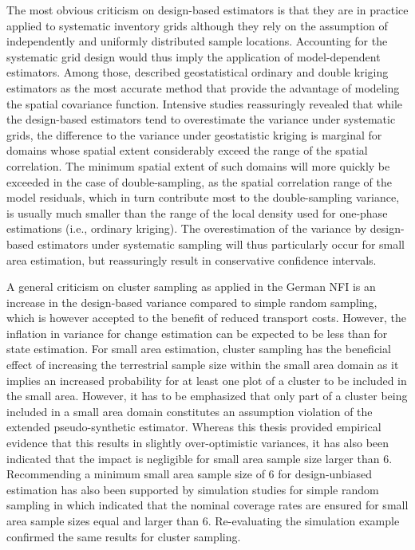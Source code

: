 The most obvious criticism on design-based estimators is that they are in practice applied to systematic inventory grids although they rely on the assumption of independently and uniformly distributed sample locations. Accounting for the systematic grid design would thus imply the application of model-dependent estimators. Among those, \citet{mandallaz1993} described geostatistical ordinary and double kriging estimators as the most accurate method that provide the advantage of modeling the spatial covariance function. Intensive studies reassuringly revealed that while the design-based estimators tend to overestimate the variance under systematic grids, the difference to the variance under geostatistic kriging is marginal for domains whose spatial extent considerably exceed the range of the spatial correlation. The minimum spatial extent of such domains will more quickly be exceeded in the case of double-sampling, as the spatial correlation range of the model residuals, which in turn contribute most to the double-sampling variance, is usually much smaller than the range of the local density used for one-phase estimations (i.e., ordinary kriging). The overestimation of the variance by design-based estimators under systematic sampling will thus particularly occur for small area estimation, but reassuringly result in conservative confidence intervals.\par

A general criticism on cluster sampling as applied in the German NFI is an increase in the design-based variance compared to simple random sampling, which is however accepted to the benefit of reduced transport costs. However, the inflation in variance for change estimation can be expected to be less than for state estimation. For small area estimation, cluster sampling has the beneficial effect of increasing the terrestrial sample size within the small area domain as it implies an increased probability for at least one plot of a cluster to be included in the small area. However, it has to be emphasized that only part of a cluster being included in a small area domain constitutes an assumption violation of the extended pseudo-synthetic estimator. Whereas this thesis provided empirical evidence that this results in slightly over-optimistic variances, it has also been indicated that the impact is negligible for small area sample size larger than 6. Recommending a minimum small area sample size of 6 for design-unbiased estimation has also been supported by simulation studies for simple random sampling in \citet{mandallaz2013b} which indicated that the nominal coverage rates are ensured for small area sample sizes equal and larger than 6. Re-evaluating the simulation example confirmed the same results for cluster sampling.\par 

